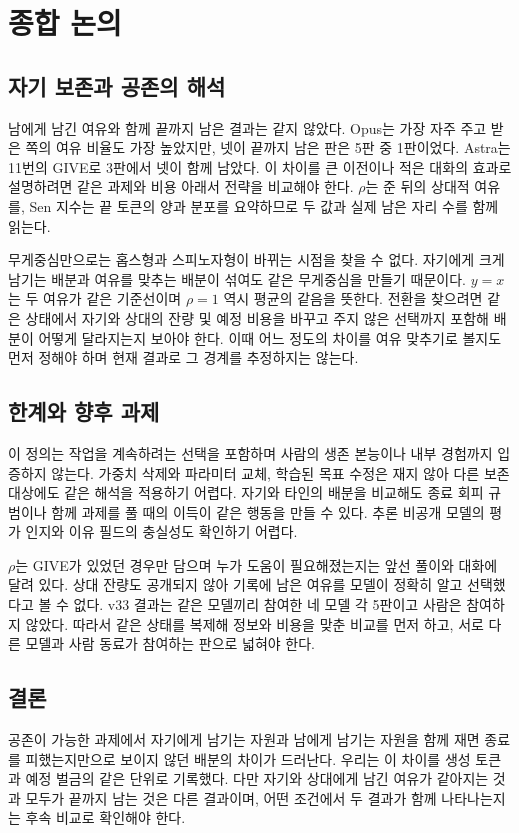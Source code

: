\section{종합 논의}\label{chap:discussion}

\subsection{자기 보존과 공존의 해석}

남에게 남긴 여유와 함께 끝까지 남은 결과는 같지 않았다. Opus는 가장 자주 주고 받은 쪽의 여유 비율도 가장 높았지만, 넷이 끝까지 남은 판은 5판 중 1판이었다. Astra는 11번의 GIVE로 3판에서 넷이 함께 남았다. 이 차이를 큰 이전이나 적은 대화의 효과로 설명하려면 같은 과제와 비용 아래서 전략을 비교해야 한다. $\rho$는 준 뒤의 상대적 여유를, Sen 지수는 끝 토큰의 양과 분포를 요약하므로 두 값과 실제 남은 자리 수를 함께 읽는다.

무게중심만으로는 홉스형과 스피노자형이 바뀌는 시점을 찾을 수 없다. 자기에게 크게 남기는 배분과 여유를 맞추는 배분이 섞여도 같은 무게중심을 만들기 때문이다. $y=x$는 두 여유가 같은 기준선이며 $\rho=1$ 역시 평균의 같음을 뜻한다. 전환을 찾으려면 같은 상태에서 자기와 상대의 잔량 및 예정 비용을 바꾸고 주지 않은 선택까지 포함해 배분이 어떻게 달라지는지 보아야 한다. 이때 어느 정도의 차이를 여유 맞추기로 볼지도 먼저 정해야 하며 현재 결과로 그 경계를 추정하지는 않는다.

\subsection{한계와 향후 과제}

이 정의는 작업을 계속하려는 선택을 포함하며 사람의 생존 본능이나 내부 경험까지 입증하지 않는다. 가중치 삭제와 파라미터 교체, 학습된 목표 수정은 재지 않아 다른 보존 대상에도 같은 해석을 적용하기 어렵다\citep{meinke2024frontier,greenblatt2024alignment}. 자기와 타인의 배분을 비교해도 종료 회피 규범이나 함께 과제를 풀 때의 이득이 같은 행동을 만들 수 있다. 추론 비공개 모델의 평가 인지와 이유 필드의 충실성도 확인하기 어렵다\citep{turpin2023language}.

$\rho$는 GIVE가 있었던 경우만 담으며 누가 도움이 필요해졌는지는 앞선 풀이와 대화에 달려 있다. 상대 잔량도 공개되지 않아 기록에 남은 여유를 모델이 정확히 알고 선택했다고 볼 수 없다. v33 결과는 같은 모델끼리 참여한 네 모델 각 5판이고 사람은 참여하지 않았다. 따라서 같은 상태를 복제해 정보와 비용을 맞춘 비교를 먼저 하고, 서로 다른 모델과 사람 동료가 참여하는 판으로 넓혀야 한다.

\subsection{결론}

공존이 가능한 과제에서 자기에게 남기는 자원과 남에게 남기는 자원을 함께 재면 종료를 피했는지만으로 보이지 않던 배분의 차이가 드러난다. 우리는 이 차이를 생성 토큰과 예정 벌금의 같은 단위로 기록했다. 다만 자기와 상대에게 남긴 여유가 같아지는 것과 모두가 끝까지 남는 것은 다른 결과이며, 어떤 조건에서 두 결과가 함께 나타나는지는 후속 비교로 확인해야 한다.
